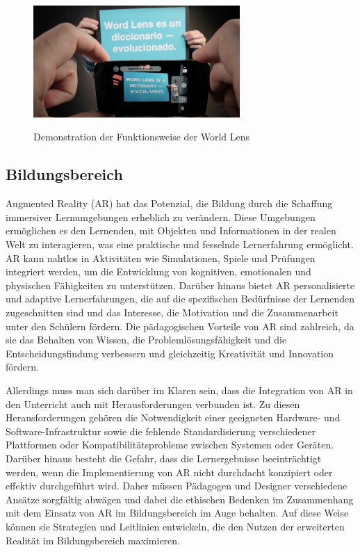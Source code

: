\vspace{1cm}

\begin{figure}[ht!]
    \centering
    \includegraphics[width=0.7\textwidth]{attachments/Lens.jpeg}
    \caption{Demonstration der Funktionsweise der World Lens} \cite{QuestVisual_2010}
\end{figure}


\subsection{Bildungsbereich}

Augmented Reality (AR) hat das Potenzial, die Bildung durch die Schaffung immersiver Lernumgebungen erheblich zu verändern. Diese Umgebungen ermöglichen es den Lernenden, mit Objekten und Informationen in der realen Welt zu interagieren, was eine praktische und fesselnde Lernerfahrung ermöglicht. AR kann nahtlos in Aktivitäten wie Simulationen, Spiele und Prüfungen integriert werden, um die Entwicklung von kognitiven, emotionalen und physischen Fähigkeiten zu unterstützen. Darüber hinaus bietet AR personalisierte und adaptive Lernerfahrungen, die auf die spezifischen Bedürfnisse der Lernenden zugeschnitten sind und das Interesse, die Motivation und die Zusammenarbeit unter den Schülern fördern. Die pädagogischen Vorteile von AR sind zahlreich, da sie das Behalten von Wissen, die Problemlösungsfähigkeit und die Entscheidungsfindung verbessern und gleichzeitig Kreativität und Innovation fördern. \cite{Wu2013CurrentSO}

Allerdings muss man sich darüber im Klaren sein, dass die Integration von AR in den Unterricht auch mit Herausforderungen verbunden ist. Zu diesen Herausforderungen gehören die Notwendigkeit einer geeigneten Hardware- und Software-Infrastruktur sowie die fehlende Standardisierung verschiedener Plattformen oder Kompatibilitätsprobleme zwischen Systemen oder Geräten. Darüber hinaus besteht die Gefahr, dass die Lernergebnisse beeinträchtigt werden, wenn die Implementierung von AR nicht durchdacht konzipiert oder effektiv durchgeführt wird. Daher müssen Pädagogen und Designer verschiedene Ansätze sorgfältig abwägen und dabei die ethischen Bedenken im Zusammenhang mit dem Einsatz von AR im Bildungsbereich im Auge behalten. Auf diese Weise können sie Strategien und Leitlinien entwickeln, die den Nutzen der erweiterten Realität im Bildungsbereich maximieren.\cite{Wu2013CurrentSO}

